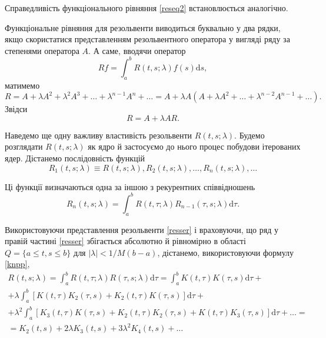 \documentclass[14pt,twoside]{extreport}
\theoremstyle{mystyle}
\numberwithin{equation}{chapter}
\begin{document}
Справедливість функціонального рівняння \eqref{reseq2} встановлюється аналогічно.

Функціональне рівняння для резольвенти виводиться буквально у два рядки, якщо скористатися представленням резольвентного оператора у вигляді ряду за степенями оператора $A$. А саме, вводячи оператор
\[
 Rf = \int_{a}^{b} R(t, s; \lambda) f(s) \mathrm{d}s,
\]
матимемо
\[
 R=A+\lambda A^2 + \lambda^2 A^3 + \ldots + \lambda^{n-1}A^n+\ldots=A+\lambda A (A+\lambda A^2 + \ldots + \lambda^{n-2}A^{n-1}+\ldots).
\]
Звідси
\[
 R = A+\lambda A R.
\]


Наведемо ще одну важливу властивість резольвенти $R(t, s; \lambda)$. Будемо розглядати $R(t, s; \lambda)$ як ядро й застосуємо до нього процес побудови ітерованих ядер. Дістанемо послідовність функцій
\[
 R_1(t, s; \lambda) \equiv R(t, s; \lambda), R_2(t, s; \lambda), \ldots, R_n(t, s; \lambda), \ldots
\]

Ці функції визначаються одна за іншою з рекурентних співвідношень
\begin{equation}
 R_n(t, s; \lambda) = \int_{a}^{b} R(t, \tau; \lambda) R_{n-1}(\tau, s; \lambda) \mathrm{d}\tau.
\end{equation}

Використовуючи представлення резольвенти \eqref{resser} і враховуючи, що ряд у правій частині \eqref{resser} збігається абсолютно й рівномірно в області $Q=\{a \leqslant t,s \leqslant b\}$ для $|\lambda|< 1/M(b-a)$, дістанемо, використовуючи формулу \eqref{knpp},
\begin{multline*}
  R(t, s; \lambda) = \displaystyle\int_{a}^{b} R(t, \tau; \lambda) R(\tau, s; \lambda) \mathrm{d}\tau =\int_{a}^{b} K(t, \tau) K(\tau, s) \mathrm{d}\tau +\\
  \displaystyle+ \lambda \int_{a}^{b} \left[K(t, \tau) K_2(\tau, s) + K_2(t, \tau) K(\tau, s)\right] \mathrm{d}\tau +\\
  \displaystyle+ \lambda^2 \int_{a}^{b} \left[K_3(t, \tau) K(\tau, s) + K_2(t, \tau) K_2(\tau, s) + K(t, \tau) K_3(\tau, s)\right] \mathrm{d}\tau +\ldots =\\
  \displaystyle= K_2(t, s) + 2\lambda K_3(t, s) +3\lambda^2 K_4(t, s) + \ldots
\end{multline*}
\end{document}
